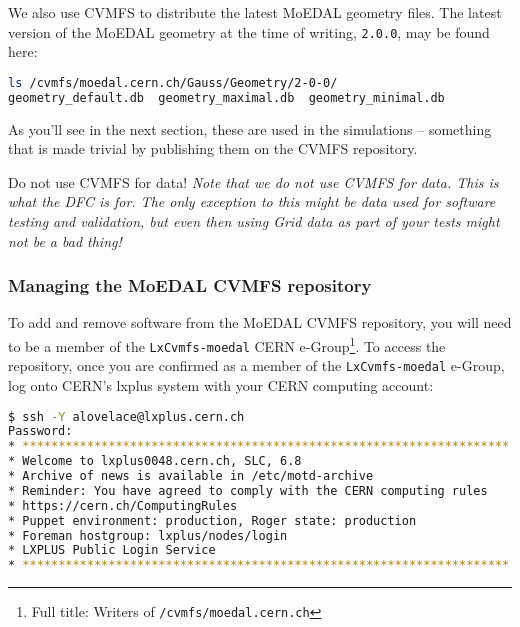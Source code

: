We also use \ac{CVMFS} to distribute the latest \ac{MoEDAL}
geometry files. The latest version of the MoEDAL geometry
at the time of writing, \texttt{2.0.0}, may be found here:

\begin{lstlisting}[gobble=0,numbers=none,language=bash]
ls /cvmfs/moedal.cern.ch/Gauss/Geometry/2-0-0/
geometry_default.db  geometry_maximal.db  geometry_minimal.db
\end{lstlisting}

As you'll see in the next section, these are used in the
simulations -- something that is made trivial by publishing them
on the \ac{CVMFS} repository.

\begin{warningbox}{Do not use CVMFS for data!}
\emph{Note that we do not use CVMFS for data. This is what the
\ac{DFC} is for. The only exception to this might be data used for
software testing and validation, but even then using Grid data
as part of your tests might not be a bad thing!}
\end{warningbox}

\clearpage


\subsubsection{Managing the MoEDAL CVMFS repository}
\label{sec:moedalcvmfsmanaging}

To add and remove software from the MoEDAL \ac{CVMFS} repository,
you will need to be a member of the
\texttt{LxCvmfs-moedal} \ac{CERN} e-Group\footnote{
Full title: Writers of \texttt{/cvmfs/moedal.cern.ch}}.
To access the repository, once you are confirmed as a member of the
\texttt{LxCvmfs-moedal} e-Group, log onto \ac{CERN}'s lxplus system
with your \ac{CERN} computing account:

\begin{lstlisting}[gobble=0,numbers=none,language=bash]
$ ssh -Y alovelace@lxplus.cern.ch
Password: 
* ********************************************************************
* Welcome to lxplus0048.cern.ch, SLC, 6.8
* Archive of news is available in /etc/motd-archive
* Reminder: You have agreed to comply with the CERN computing rules
* https://cern.ch/ComputingRules
* Puppet environment: production, Roger state: production
* Foreman hostgroup: lxplus/nodes/login
* LXPLUS Public Login Service
* ********************************************************************
\end{lstlisting}

